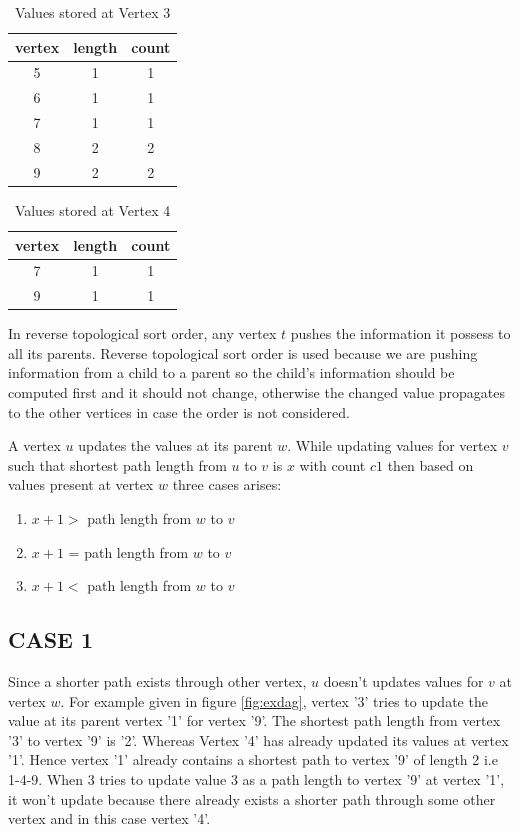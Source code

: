 \begin{table}[h!]
\centering
\begin{tabular}{|c|c|c|}
\hline
vertex & length & count \\
\hline
5 & 1 & 1 \\ 
\hline
6 & 1 & 1 \\ 
\hline
7 & 1 & 1 \\ 
\hline
8 & 2 & 2 \\ 
\hline
9 & 2 & 2 \\ 
\hline
\end{tabular}
\caption{Values stored at Vertex 3}
\label{tab:data3}
\end{table}




\begin{table}[h!]
\centering
\begin{tabular}{|c|c|c|}
\hline
vertex & length & count \\
\hline
7 & 1 & 1 \\ 
\hline
9 & 1 & 1 \\ 
\hline
\end{tabular}
\caption{Values stored at Vertex 4}
\label{tab:data4}
\end{table}




In reverse topological sort order, any vertex $t$ pushes the information it possess to all its parents. Reverse topological sort order is used because we are pushing information from a child to a parent so the child's information should be computed first and it should not change, otherwise the changed value propagates to the other vertices in case the order is not considered. 

A vertex $u$ updates the values at its parent $w$.
While updating values for vertex $v$ such that shortest path length from $u$ to $v$ is $x$ with count $c1$ then based on values present at vertex $w$ three cases arises:
\begin{enumerate}
\item  $x + 1 >$ path length from $w$ to $v$
\item  $x + 1$ = path length from $w$ to $v$
\item  $x + 1 <$ path length from $w$ to $v$
\end{enumerate}
\vspace{-2.0em}
\subsection{CASE 1}
\vspace{-1.0em}
Since a shorter path exists through other vertex, $u$ doesn't updates values for $v$ at vertex $w$.
For example given in figure \ref{fig:exdag}, vertex '3' tries to update the value at its parent vertex '1' for vertex '9'. The shortest path length from vertex '3' to vertex '9' is  '2'. Whereas Vertex '4' has already updated its values at vertex '1'. Hence vertex '1' already contains a shortest path to  vertex '9' of length 2 i.e 1-4-9. When 3 tries to update value 3 as a path length to vertex '9' at vertex '1', it won't update because there already exists a shorter path through some other vertex and in this case vertex '4'. 

